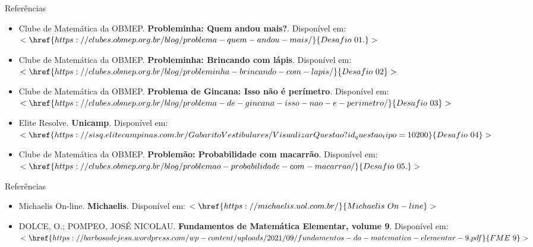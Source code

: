 \documentclass[12pt]{beamer}
\begin{document}
\begin{frame}{Referências}
	\justifying
	\begin{itemize}
		\item Clube de Matemática da OBMEP. \textbf{Probleminha: Quem andou mais?}. Disponível em: $<\href{https://clubes.obmep.org.br/blog/problema-quem-andou-mais/}{Desafio\  01.}>$
		
		\item Clube de Matemática da OBMEP. \textbf{Probleminha: Brincando com lápis}. Disponível em: $<\href{https://clubes.obmep.org.br/blog/probleminha-brincando-com-lapis/}{Desafio\  02}>$
		
		\item Clube de Matemática da OBMEP. \textbf{Problema de Gincana: Isso não é perímetro}. Disponível em: $<\href{https://clubes.obmep.org.br/blog/problema-de-gincana-isso-nao-e-perimetro/}{Desafio\  03}>$
		
		\item Elite Resolve. \textbf{Unicamp}. Disponível em: $<\href{https://sisq.elitecampinas.com.br/GabaritoVestibulares/VisualizarQuestao?id_questao_tipo=10200}{Desafio\ 04}>$
		
		\item Clube de Matemática da OBMEP. \textbf{Problemão: Probabilidade com macarrão}. Disponível em: $<\href{https://clubes.obmep.org.br/blog/problemao-probabilidade-com-macarrao/}{Desafio\  05.}>$
	\end{itemize}
\end{frame}

\begin{frame}{Referências}
	\justifying
	\begin{itemize}
		\item Michaelis On-line. \textbf{Michaelis}. Disponível em: $<\href{https://michaelis.uol.com.br/}{Michaelis\ On-line}>$
		
		\item DOLCE, O.; POMPEO, JOSÉ NICOLAU. \textbf{Fundamentos de Matemática Elementar, volume 9}. Disponível em: $<\href{https://barbosadejesu.wordpress.com/wp-content/uploads/2021/09/fundamentos-da-matematica-elementar-9.pdf}{FME\  9}>$
		
	
	\end{itemize}
\end{frame}
\end{document}
